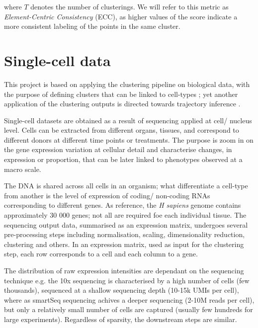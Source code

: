     where $T$ denotes the number of clusterings. We will refer to this metric as \textit{Element-Centric Consistency} (ECC), as higher values of the score indicate a more consistent labeling of the points in the same cluster.
    

\section{Single-cell data}
This project is based on applying the clustering pipeline on biological data, with the purpose of defining clusters that can be linked to cell-types \cite{Kiselev2019a}; yet another application of the clustering outputs is directed towards trajectory inference \cite{Saelens2019}. 

Single-cell datasets are obtained as a result of sequencing applied at cell/ nucleus level. Cells can be extracted from different organs, tissues, and correspond to different donors at different time points or treatments. The purpose is zoom in on the gene expression variation at cellular detail and characterise changes, in expression or proportion, that can be later linked to phenotypes observed at a macro scale. 

The DNA is shared across all cells in an organism; what differentiate a cell-type from another is the level of expression of coding/ non-coding RNAs corresponding to different genes. As reference, the \textit{H sapiens} genome contains approximately 30 000 genes; not all are required foe each individual tissue. The sequencing output data, summarised as an expression matrix, undergoes several pre-processing steps including normalisation, scaling, dimensionality reduction, clustering and others. In an expression matrix, used as input for the clustering step, each row corresponds to a cell and each column to a gene.

The distribution of raw expression intensities are dependant on the sequencing technique e.g. the 10x sequencing is characterised by a high number of cells (few thousands), sequenced at a shallow sequencing depth (10-15k UMIs per cell), where as smartSeq sequencing achives a deeper sequencing (2-10M reads per cell), but only a relatively small number of cells are captured (usually few hundreds for large experiments). Regardless of sparsity, the downstream steps are similar.